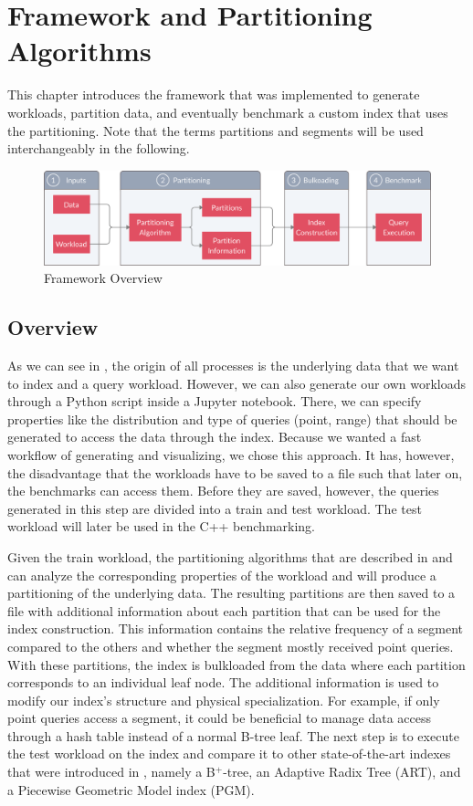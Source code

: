 \thispagestyle{plain}
\chapter{Framework and Partitioning Algorithms}\label{sec:framework}
This chapter introduces the framework that was implemented to generate workloads, partition data, and eventually benchmark a custom index that uses the partitioning. Note that the terms partitions and segments will be used interchangeably in the following.
\begin{figure}[H]
    \centering
    \includegraphics[width=\textwidth]{figures/pipeline.pdf}
    \caption{Framework Overview}
    \label{fig:framework}
\end{figure}

\section{Overview}
As we can see in , the origin of all processes is the underlying data that we want to index and a query workload. However, we can also generate our own workloads through a Python script inside a Jupyter notebook. There, we can specify properties like the distribution and type of queries (point, range) that should be generated to access the data through the index. Because we wanted a fast workflow of generating and visualizing, we chose this approach. It has, however, the disadvantage that the workloads have to be saved to a file such that later on, the benchmarks can access them. Before they are saved, however, the queries generated in this step are divided into a train and test workload. The test workload will later be used in the C++ benchmarking.

Given the train workload, the partitioning algorithms that are described in  and  can analyze the corresponding properties of the workload and will produce a partitioning of the underlying data. The resulting partitions are then saved to a file with additional information about each partition that can be used for the index construction. This information contains the relative frequency of a segment compared to the others and whether the segment mostly received point queries.
With these partitions, the index is bulkloaded from the data where each partition corresponds to an individual leaf node. The additional information is used to modify our index's structure and physical specialization. For example, if only point queries access a segment, it could be beneficial to manage data access through a hash table instead of a normal B-tree leaf. The next step is to execute the test workload on the index and compare it to other state-of-the-art indexes that were introduced in , namely a B$^+$-tree, an Adaptive Radix Tree (ART), and a Piecewise Geometric Model index (PGM).


